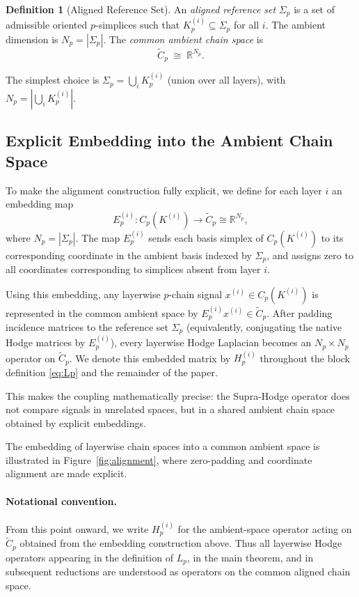 \documentclass[11pt]{article}
\theoremstyle{definition}
\newtheorem{definition}[theorem]{Definition}
\theoremstyle{remark}
\newcommand{\R}{\mathbb{R}}
\newcommand{\Ctil}{\widetilde{C}}
\begin{document}
\begin{definition}[Aligned Reference Set]
An \emph{aligned reference set} $\Sigma_p$ is a set of admissible oriented
$p$-simplices such that $K_p^{(i)}\subseteq\Sigma_p$ for all $i$. The ambient
dimension is $N_p = |\Sigma_p|$. The \emph{common ambient chain space} is
\[
  \Ctil_p \;\cong\; \R^{N_p}.
\]
\end{definition}

The simplest choice is $\Sigma_p = \bigcup_i K_p^{(i)}$ (union over all
layers), with $N_p = |\bigcup_i K_p^{(i)}|$.

\subsection{Explicit Embedding into the Ambient Chain Space}

To make the alignment construction fully explicit, we define for each layer $i$ an embedding map
\[
E_p^{(i)} : C_p\!\left(K^{(i)}\right) \longrightarrow \Ctil_p \cong \R^{N_p},
\]
where $N_p = |\Sigma_p|$. The map $E_p^{(i)}$ sends each basis simplex of $C_p(K^{(i)})$
to its corresponding coordinate in the ambient basis indexed by $\Sigma_p$, and assigns zero to all coordinates corresponding to simplices absent from layer $i$.

Using this embedding, any layerwise $p$-chain signal $x^{(i)} \in C_p(K^{(i)})$ is represented in the common ambient space by $E_p^{(i)}x^{(i)} \in \Ctil_p$. After padding incidence matrices to the reference set $\Sigma_p$ (equivalently, conjugating the native Hodge matrices by $E_p^{(i)}$), every layerwise Hodge Laplacian becomes an $N_p\times N_p$ operator on $\Ctil_p$. We denote this embedded matrix by $H_p^{(i)}$ throughout the block definition \eqref{eq:Lp} and the remainder of the paper.

This makes the coupling mathematically precise: the Supra-Hodge operator does not compare signals in unrelated spaces, but in a shared ambient chain space obtained by explicit embeddings.

The embedding of layerwise chain spaces into a common ambient space is
illustrated in Figure~\ref{fig:alignment}, where zero-padding and coordinate
alignment are made explicit.

\FigureAThree

\paragraph{Notational convention.}
From this point onward, we write $H_p^{(i)}$ for the ambient-space operator acting on $\Ctil_p$ obtained from the embedding construction above. Thus all layerwise Hodge operators appearing in the definition of $L_p$, in the main theorem, and in subsequent reductions are understood as operators on the common aligned chain space.
\end{document}
